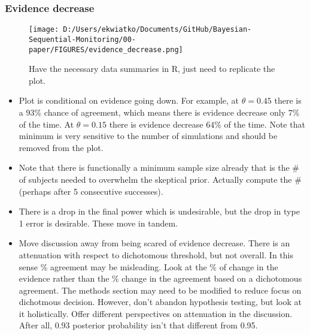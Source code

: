 \documentclass[12pt]{article}
\begin{document}
\subsubsection{Evidence decrease}
\begin{figure}
\texttt{[image: D:/Users/ekwiatko/Documents/GitHub/Bayesian-Sequential-Monitoring/00-paper/FIGURES/evidence\_decrease.png]}
\caption{Have the necessary data summaries in R, just need to replicate the plot.}
\end{figure}
\begin{itemize}
\item Plot is conditional on evidence going down. For example, at $\theta=0.45$ there is a $93\%$ chance of agreement, which means there is evidence decrease only $7\%$ of the time. At $\theta=0.15$ there is evidence decrease $64\%$ of the time. Note that minimum is very sensitive to the number of simulations and should be removed from the plot. 
\item Note that there is functionally a minimum sample size already that is the \# of subjects needed to overwhelm the skeptical prior. Actually compute the \# (perhaps after 5 consecutive successes).
\item There is a drop in the final power which is undesirable, but the drop in type 1 error is desirable. These move in tandem.
\item Move discussion away from being scared of evidence decrease. There is an attenuation with respect to dichotomous threshold, but not overall. In this sense \% agreement may be misleading. Look at the \% of change in the evidence rather than the \% change in the agreement based on a dichotomous agreement. The methods section may need to be modified to reduce focus on dichotmous decision. However, don't abandon hypothesis testing, but look at it holistically. Offer different perspectives on attenuation in the discussion. After all, 0.93 posterior probability isn't that different from 0.95.
\end{itemize}

\newpage
\end{document}

